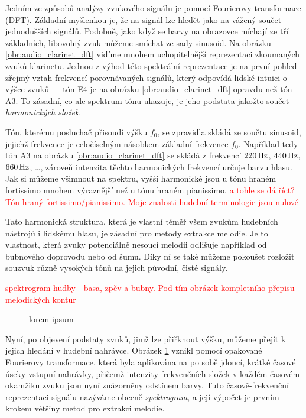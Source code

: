 Jedním ze způsobů analýzy zvukového signálu je pomocí Fourierovy transformace (DFT). Základní myšlenkou je, že na signál lze hledět jako na vážený součet jednodušších signálů. Podobně, jako když se barvy na obrazovce míchají ze tří základních, libovolný zvuk můžeme smíchat ze sady sinusoid. Na obrázku \ref{obr:audio_clarinet_dft} vidíme mnohem uchopitelnější reprezentaci zkoumaných zvuků klarinetu. Jednou z výhod této spektrální reprezentace je na první pohled zřejmý vztah frekvencí porovnávaných signálů, který odpovídá lidské intuici o výšce zvuků --- tón E4 je na obrázku \ref{obr:audio_clarinet_dft} opravdu  než tón A3. To zásadní, co ale spektrum tónu ukazuje, je jeho podstata jakožto součet \emph{harmonických složek}. 

Tón, kterému posluchač přisoudí výšku $f_0$, se zpravidla skládá ze součtu sinusoid, jejichž frekvence je celočíselným násobkem základní frekvence $f_0$. Například tedy tón A3 na obrázku \ref{obr:audio_clarinet_dft} se skládá z frekvencí $220\,\rm Hz$, $440\,\rm Hz$, $660\,\rm Hz$, \dots, zároveň intenzita těchto harmonických frekvencí určuje barvu hlasu. Jak si můžeme všimnout na spektru, vyšší harmonické jsou u tónu hraném fortissimo mnohem výraznější než u tónu hraném pianissimo. \textcolor{red}{a tohle se dá říct? Tón hraný fortissimo/pianissimo. Moje znalosti hudební terminologie jsou nulové}

Tato harmonická struktura, která je vlastní téměř všem zvukům hudebních nástrojů i lidskému hlasu, je zásadní pro metody extrakce melodie. Je to vlastnost, která zvuky potenciálně nesoucí melodii odlišuje například od bubnového doprovodu nebo od šumu. Díky ní se také můžeme pokoušet rozložit souzvuk různě vysokých tónů na jejich původní, čisté signály. 

\textcolor{red}{spektrogram hudby - basa, zpěv a bubny. Pod tím obrázek kompletního přepisu melodických kontur}

\begin{figure}[h]\centering
\caption{lorem ipsum}
\label{obr:audio_mix_stft}
\end{figure}

Nyní, po objevení podstaty zvuků, jimž lze přiřknout výšku, můžeme přejít k jejich hledání v hudební nahrávce. Obrázek \ref{obr:audio_mix_stft} vznikl pomocí opakované Fourierovy transformace, která byla aplikována na po sobě jdoucí, krátké časové úseky vstupní nahrávky, přičemž intenzity frekvenčních složek v každém časovém okamžiku zvuku jsou nyní znázorněny odstínem barvy. Tuto časově-frekvenční reprezentaci signálu nazýváme obecně \emph{spektrogram}, a její výpočet je prvním krokem většiny metod pro extrakci melodie.


